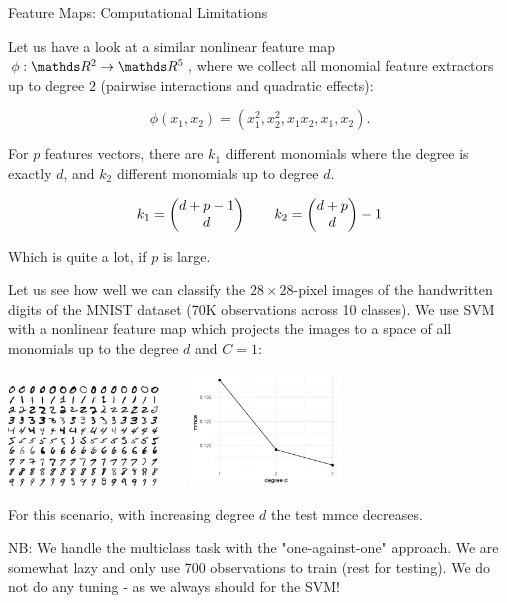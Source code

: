 \documentclass[11pt,compress,t,notes=noshow, xcolor=table]{beamer}
\begin{document}
\begin{vbframe}{Feature Maps: Computational Limitations}

Let us have a look at a similar nonlinear feature map $\phi: \R^2 \to \R^5$, where we collect all monomial feature extractors up to degree $2$ (pairwise interactions and quadratic effects):

$$
\phi(x_1, x_2) = (x_1^2, x_2^2, x_1  x_2, x_1, x_2).
$$

For $p$ features vectors, there are $k_1$ different monomials where the degree is exactly $d$, and $k_2$ different monomials up to degree $d$.


$$
k_1 = \begin{pmatrix} d + p - 1 \\ d \end{pmatrix} \qquad k_2 = \begin{pmatrix} d + p \\ d \end{pmatrix}-1
$$

Which is quite a lot, if $p$ is large.

\framebreak 
\begin{footnotesize}
Let us see how well we can classify the $28 \times 28$-pixel images of the handwritten digits of the MNIST dataset (70K observations across 10 classes). 
We use SVM with a nonlinear feature map which projects the images to a space of all monomials up to the degree $d$ and $C=1$:


\begin{center}
\includegraphics[width = 4cm ]{figure_man/introduction/mnist-eps-converted-to.pdf} ~~~ \includegraphics[width=4cm]{figure/mnist_svm_mmce.png}
\end{center}




\vspace{.3cm}
For this scenario, with increasing degree $d$ the test mmce decreases.

\vfill

NB: We handle the multiclass task with the "one-against-one" approach. 
We are somewhat lazy and only use 700 observations to train (rest for testing).
We do not do any tuning - as we always should for the SVM!


\end{footnotesize}
\end{vbframe}
\end{document}
